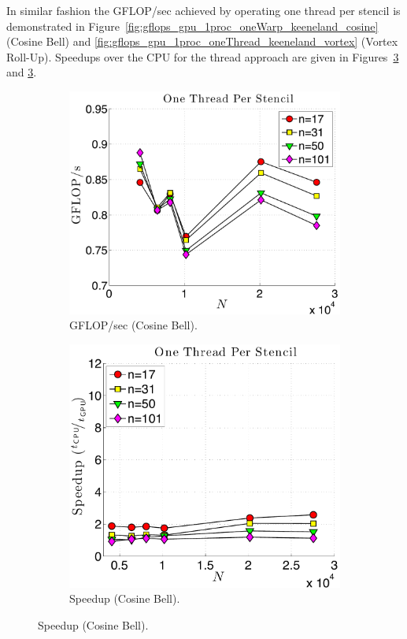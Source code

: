 In similar fashion the GFLOP/sec achieved by operating one thread per stencil is demonstrated in Figure~\ref{fig:gflops_gpu_1proc_oneWarp_keeneland_cosine} (Cosine Bell) and \ref{fig:gflops_gpu_1proc_oneThread_keeneland_vortex} (Vortex Roll-Up). Speedups over the CPU for the thread approach are given in Figures~\ref{fig:speedup_1proc_oneThread_keeneland_cosine} and \ref{fig:speedup_1proc_oneThread_keeneland_cosine}. 


\begin{figure}
\centering
\begin{subfigure}[t]{0.46\textwidth}
\includegraphics[width=\textwidth]{../figures/keeneland_results/alltoallv_cosine/gflops_gpu_1proc_oneThreadPerStencil.pdf}
\caption{GFLOP/sec (Cosine Bell).}
\label{fig:gflops_gpu_1proc_oneThread_keeneland_cosine}
\end{subfigure}
\quad
\begin{subfigure}[t]{0.425\textwidth}
\includegraphics[width=\textwidth]{../figures/keeneland_results/alltoallv_cosine/speedup_1proc_oneThreadPerStencil.pdf}
\caption{Speedup (Cosine Bell).}
\label{fig:speedup_1proc_oneThread_keeneland_cosine}
\end{subfigure} 


\end{figure}
